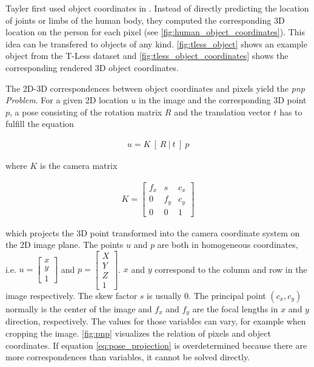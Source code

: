 Tayler \etal first used object coordinates in \cite{tsharp}. Instead of directly predicting the location of joints or limbs of the human body, they computed the corresponding 3D location on the person for each pixel (see \fig \ref{fig:human_object_coordinates}). This idea can be transfered to objects of any kind. \fig \ref{fig:tless_object} shows an example object from the T-Less dataset \cite{tless} and \fig \ref{fig:tless_object_coordinates} shows the corresponding rendered 3D object coordinates.

The 2D-3D correspondences between object coordinates and pixels yield the \textit{\ac{pnp} Problem}. For a given 2D location $u$ in the image and the corresponding 3D point $p$, a pose consisting of the rotation matrix $R$ and the translation vector $t$ has to fulfill the equation

\begin{align}
 u = K \ [ \ R \ | \ t \ ] \ p \label{eq:pose_projection}
\end{align} 
 
\noindent where $K$ is the camera matrix

\begin{align}
K = \begin{bmatrix}
f_x & s & c_x \\
0 & f_y & c_y \\
0 & 0 & 1 
\end{bmatrix}
\end{align}

\noindent which projects the 3D point transformed into the camera coordinate system on the 2D image plane. The points $u$ and $p$ are both in homogeneous coordinates, i.e. $u = \begin{bmatrix} x \\ y \\ 1 \end{bmatrix}$ and $p = \begin{bmatrix} X \\ Y \\ Z \\ 1 \end{bmatrix}$. $x$ and $y$ correspond to the column and row in the image respectively. The skew factor $s$ is usually $0$. The principal point $(c_x, c_y)$ normally is the center of the image and $f_x$ and $f_y$ are the focal lengths in $x$ and $y$ direction, respectively. The values for those variables can vary, for example when cropping the image. \fig \ref{fig:pnp} visualizes the relation of pixels and object coordinates. If equation \ref{eq:pose_projection} is overdetermined because there are more correspondences than variables, it cannot be solved directly.

